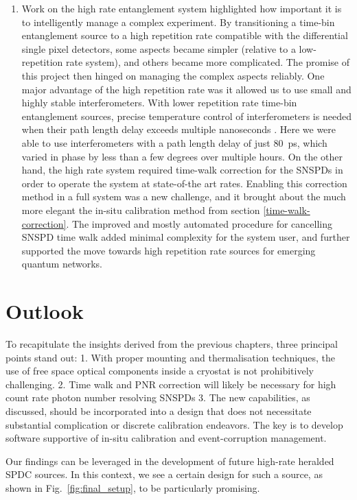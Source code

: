 \documentclass[11pt]{caltech_thesis} %
\begin{document}
\begin{enumerate}
\item
  Work on the high rate entanglement system highlighted how important it is to intelligently manage a complex experiment. By transitioning a time-bin entanglement source to a high repetition rate compatible with the differential single pixel detectors, some aspects became simpler (relative to a low-repetition rate system), and others became more complicated. The promise of this project then hinged on managing the complex aspects reliably. One major advantage of the high repetition rate was it allowed us to use small and highly stable interferometers. With lower repetition rate time-bin entanglement sources, precise temperature control of interferometers is needed when their path length delay exceeds multiple nanoseconds \autocite{Valivarthi2020}. Here we were able to use interferometers with a path length delay of just 80~ps, which varied in phase by less than a few degrees over multiple hours. On the other hand, the high rate system required time-walk correction for the SNSPDs in order to operate the system at state-of-the art rates. Enabling this correction method in a full system was a new challenge, and it brought about the much more elegant the in-situ calibration method from section \ref{time-walk-correction}. The improved and mostly automated procedure for cancelling SNSPD time walk added minimal complexity for the system user, and further supported the move towards high repetition rate sources for emerging quantum networks.
\end{enumerate}

\hypertarget{outlook}{%
\section{Outlook}\label{outlook}}

To recapitulate the insights derived from the previous chapters, three principal points stand out:
1. With proper mounting and thermalisation techniques, the use of free space optical components inside a cryostat is not prohibitively challenging.
2. Time walk and PNR correction will likely be necessary for high count rate photon number resolving SNSPDs
3. The new capabilities, as discussed, should be incorporated into a design that does not necessitate substantial complication or discrete calibration endeavors. The key is to develop software supportive of in-situ calibration and event-corruption management.

Our findings can be leveraged in the development of future high-rate heralded SPDC sources. In this context, we see a certain design for such a source, as shown in Fig.~\ref{fig:final_setup}, to be particularly promising.
\end{document}
